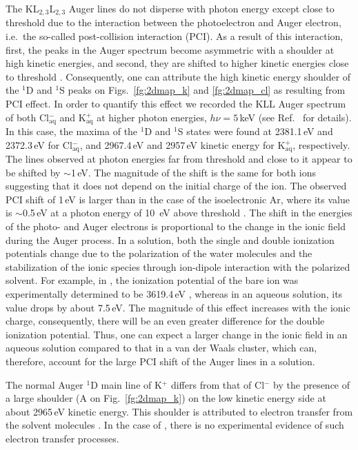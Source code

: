 The KL$_{2,3}$L$_{2,3}$ Auger lines do not disperse with photon energy except close to threshold due to the interaction between the photoelectron and Auger electron, i.e.\ the so-called post-collision interaction (PCI). As a result of this interaction, first, the peaks in the Auger spectrum become asymmetric with a shoulder at high kinetic energies, and second, they are shifted to higher kinetic energies close to threshold \citep{russek86:911,guillemin15:012503}. Consequently, one can attribute the high kinetic energy shoulder of the $^1$D and $^1$S peaks on Figs.\ \ref{fg:2dmap_k} and \ref{fg:2dmap_cl} as resulting from PCI effect. In order to quantify this effect we recorded the KLL Auger spectrum of both Cl$^{-}_{\text{aq}}$ and K$^{+}_{\text{aq}}$ at higher photon energies, $h\nu = 5$\,keV (see Ref.\ \citep{ceolin17:263003} for details). In this case, the maxima of the $^1$D and $^1$S states were found at 2381.1\,eV and 2372.3\,eV for Cl$^{-}_{\text{aq}}$, and 2967.4\,eV and 2957\,eV kinetic energy for K$^{+}_{\text{aq}}$, respectively. The lines observed at photon energies far from threshold and close to it appear to be shifted by $\sim$1\,eV. The magnitude of the shift is the same for both ions suggesting that it does not depend on the initial charge of the ion. The observed PCI shift of 1\,eV is larger than in the case of the isoelectronic Ar, where its value is $\sim$0.5\,eV at a photon energy of 10 \,eV above threshold \citep{guillemin15:012503}. The shift in the energies of the photo- and Auger electrons is proportional to the change in the ionic field during the Auger process. In a solution, both the single and double ionization potentials change due to the polarization of the water molecules and the stabilization of the ionic species through ion-dipole interaction with the polarized solvent. For example, in \ki, the ionization potential of the bare ion was experimentally determined to be 3619.4\,eV \citep{hertlein06:062715}, whereas in an aqueous solution, its value drops by about 7.5\,eV. The magnitude of this effect increases with the ionic charge, consequently, there will be an even greater difference for the double ionization potential. Thus, one can expect a larger change in the ionic field in an aqueous solution compared to that in a van der Waals cluster, which can, therefore, account for the large PCI shift of the Auger lines in a solution.


The normal Auger $^1$D main line of K$^{+}$ differs from that of Cl$^{-}$ by the presence of a large shoulder (A on Fig.\ \ref{fg:2dmap_k}) on the low kinetic energy side at about 2965\,eV kinetic energy. This shoulder is attributed to electron transfer from the solvent molecules \citep{ceolin17:263003}. In the case of \cli, there is no experimental evidence of such electron transfer processes.


